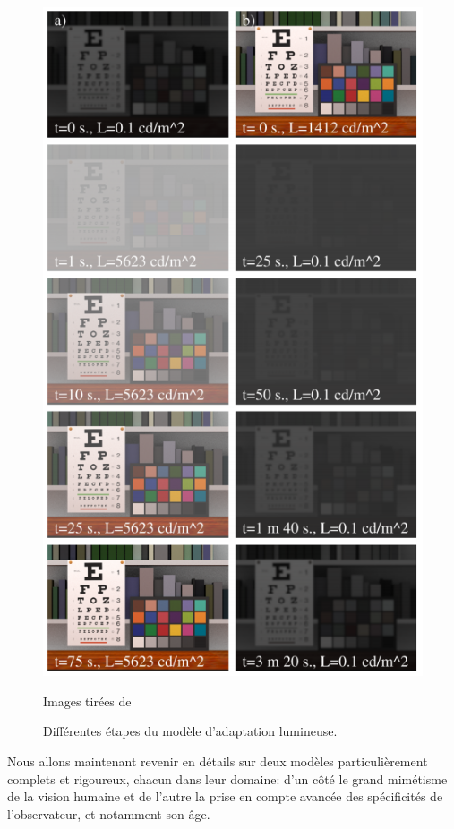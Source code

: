 	\begin{figure}[h]
		\centering
		\includegraphics[scale=1]{Figures/FerwerdaAdaptationSteps}
		\caption{Différentes étapes du modèle d'adaptation lumineuse.}{Images tirées de \citep{ferwerda_model_1996}}
		\label{fig:ferwerda_adaptation_steps}
	\end{figure}
	
	\par Nous allons maintenant revenir en détails sur deux modèles particulièrement complets et rigoureux, chacun dans leur domaine: d'un côté le grand mimétisme de la vision humaine et de l'autre la prise en compte avancée des spécificités de l'observateur, et notamment son âge.
	
